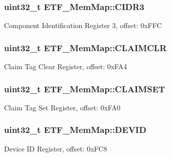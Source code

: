 \subsubsection[{C\+I\+D\+R3}]{\setlength{\rightskip}{0pt plus 5cm}uint32\+\_\+t E\+T\+F\+\_\+\+Mem\+Map\+::\+C\+I\+D\+R3}\label{struct_e_t_f___mem_map_a8ff6c84678887a89964218abe295b05f}
Component Identification Register 3, offset\+: 0x\+F\+F\+C \hypertarget{struct_e_t_f___mem_map_a91788605a9f984b8e1a998b4f9b0b606}{}
\subsubsection[{C\+L\+A\+I\+M\+C\+L\+R}]{\setlength{\rightskip}{0pt plus 5cm}uint32\+\_\+t E\+T\+F\+\_\+\+Mem\+Map\+::\+C\+L\+A\+I\+M\+C\+L\+R}\label{struct_e_t_f___mem_map_a91788605a9f984b8e1a998b4f9b0b606}
Claim Tag Clear Register, offset\+: 0x\+F\+A4 \hypertarget{struct_e_t_f___mem_map_a044d760d7129c74de25a8f82ea1b4624}{}
\subsubsection[{C\+L\+A\+I\+M\+S\+E\+T}]{\setlength{\rightskip}{0pt plus 5cm}uint32\+\_\+t E\+T\+F\+\_\+\+Mem\+Map\+::\+C\+L\+A\+I\+M\+S\+E\+T}\label{struct_e_t_f___mem_map_a044d760d7129c74de25a8f82ea1b4624}
Claim Tag Set Register, offset\+: 0x\+F\+A0 \hypertarget{struct_e_t_f___mem_map_aee80b184feed55cdc9d611672417d6e6}{}
\subsubsection[{D\+E\+V\+I\+D}]{\setlength{\rightskip}{0pt plus 5cm}uint32\+\_\+t E\+T\+F\+\_\+\+Mem\+Map\+::\+D\+E\+V\+I\+D}\label{struct_e_t_f___mem_map_aee80b184feed55cdc9d611672417d6e6}
Device I\+D Register, offset\+: 0x\+F\+C8 \hypertarget{struct_e_t_f___mem_map_a6bc4c22708e71bde72f0c04236c471c5}{}
